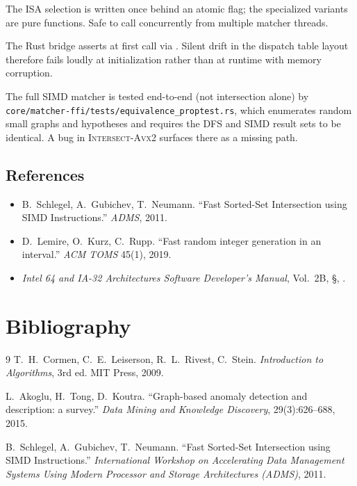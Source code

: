 \documentclass[11pt,openany]{book}
\begin{document}
\begin{invariant}
\label{inv:simd:thread}
The ISA selection is written once behind an atomic flag; the
specialized variants are pure functions. Safe to call concurrently
from multiple matcher threads.
\end{invariant}

\begin{invariant}
\label{inv:simd:abi}
The Rust bridge asserts 
at first call via . Silent drift in the
dispatch table layout therefore fails loudly at initialization
rather than at runtime with memory corruption.
\end{invariant}

\begin{implnote}
The full SIMD matcher is tested end-to-end (not intersection alone)
by \texttt{core/matcher-ffi/tests/equivalence\_proptest.rs}, which
enumerates random small graphs and hypotheses and requires the DFS
and SIMD result sets to be identical. A bug in
\textsc{Intersect-Avx2} surfaces there as a missing path.
\end{implnote}

\section{References}
\label{sec:simd:refs}
\begin{itemize}
  \item B.~Schlegel, A.~Gubichev, T.~Neumann. ``Fast Sorted-Set
        Intersection using SIMD Instructions.'' \emph{ADMS},
        2011.~\cite{schlegel}
  \item D.~Lemire, O.~Kurz, C.~Rupp. ``Fast random integer generation
        in an interval.'' \emph{ACM TOMS} 45(1), 2019.
  \item \emph{Intel 64 and IA-32 Architectures Software Developer's
        Manual}, Vol.\ 2B, \S{}, .
\end{itemize}

\backmatter

\chapter*{Bibliography}
\begin{thebibliography}{9}
    T.~H.~Cormen, C.~E.~Leiserson, R.~L.~Rivest, C.~Stein.
    \emph{Introduction to Algorithms}, 3rd ed. MIT Press, 2009.

    L.~Akoglu, H.~Tong, D.~Koutra.
    ``Graph-based anomaly detection and description: a survey.''
    \emph{Data Mining and Knowledge Discovery}, 29(3):626--688, 2015.

    B.~Schlegel, A.~Gubichev, T.~Neumann.
    ``Fast Sorted-Set Intersection using SIMD Instructions.''
    \emph{International Workshop on Accelerating Data Management
    Systems Using Modern Processor and Storage Architectures
    (ADMS)}, 2011.
\end{thebibliography}
\end{document}
